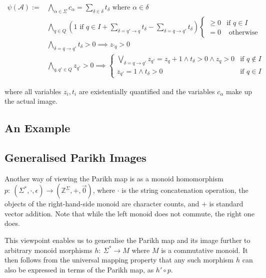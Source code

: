 \documentclass[runningheads]{llncs}
\begin{document}
$$
\begin{aligned}
\psi(\mathcal{A}) := 
& \bigwedge_{\alpha \in \Sigma}
c_\alpha = \sum_{\delta \in \delta} t_\delta  
\text{ where $\alpha \in \delta$}\\
&\bigwedge_{q \in Q} \left (\text{$1$ if $q \in I$} +
\sum_{\delta = q' \xrightarrow{} q} t_\delta 
- \sum_{\delta = q\xrightarrow{}q'} t_\delta \right)
\begin{cases}
\geq 0 & \text{if $q \in I$} \\
= 0 & \text{ otherwise}
\end{cases}\\
& \bigwedge_{\delta = q \xrightarrow{} q'} t_\delta > 0 
\implies z_{'q} > 0 \\
& \bigwedge_{q, q' \in Q} z_{q'} > 0 
\implies 
\begin{cases}
\bigvee\limits_{\delta = q \xrightarrow{} q'} z_{q'} = z_{q} + 1 \land t_\delta > 0 \land z_{q} > 0 & \text{if $q \not\in  I$} \\
z_{q'} = 1 \land t_\delta > 0& \text{if $q \in I$}
\end{cases}
\end{aligned}
$$

where all variables $z_i, t_i$ are existentially quantified and the variables $c_\alpha$ make up the actual image.

\subsection{An Example}

\subsection{Generalised Parikh Images}\label{sec:generalised}

Another way of viewing the Parikh map is as a monoid homomorphism $p:\: \left(\Sigma^*, \cdot, \epsilon \right) \to (\mathbb{Z}^\Sigma, +, \vec{0})$, where $\cdot$ is the string concatenation operation, the objects of the right-hand-side monoid are character counts, and $+$ is standard vector addition. Note that while the left monoid does not commute, the right one does.

This viewpoint enables us to generalise the Parikh map and its image further to arbitrary monoid morphisms $h:\: \Sigma^* \to M$ where $M$ is a commutative monoid. It then follows from the universal mapping property that any such morphism $h$ can also be expressed in terms of the Parikh map, as $h' \circ p$.
\end{document}
